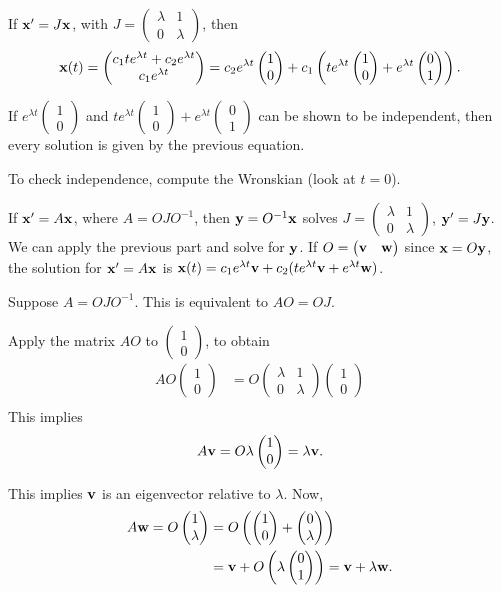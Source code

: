 \documentclass{article}
\newcommand{\mat}[1]{\begin{pmatrix}#1\end{pmatrix}}
\begin{document}
If $\mathbf{x}' = J \mathbf{x}$, with $J = \mat{\lambda & 1 \\ 0 & \lambda}$, then
\begin{align*}
  \mbf{x}(t) = \mat{c_1 t e^{\lambda t} + c_2 e^{\lambda t} \\ c_1 e^{\lambda t}} = c_2 e^{\lambda t} \mat{1 \\ 0} + c_1 \left( t e^{\lambda t} \mat{1 \\ 0} + e^{\lambda t} \mat{0 \\ 1} \right).
\end{align*}

If $e^{\lambda t} \mat{1 \\ 0}$ and $t e^{\lambda t} \mat{1 \\ 0} + e^{\lambda t} \mat{0 \\ 1}$ can be shown to be independent, then every solution is given by the previous equation.

To check independence, compute the Wronskian (look at $t=0$).

If $\mathbf{x}' = A \mathbf{x}$, where $A = O J O^{-1}$, then $\mathbf{y} = O^{-1} \mathbf{x}$ solves $J = \mat{\lambda & 1 \\ 0 & \lambda}$, $\mathbf{y}' = J \mathbf{y}$.  We can apply the previous part and solve for $\mathbf{y}$.  If $O = \mat{\mbf{v} & \mbf{w}}$ since $\mathbf{x} = O \mathbf{y}$, the solution for $\mathbf{x}' = A \mathbf{x}$ is $\mathbf{x}(t) = c_1 e^{\lambda t} \mathbf{v} + c_2(t e^{\lambda t} \mathbf{v} + e^{\lambda t} \mathbf{w})$.

Suppose $A = O J O^{-1}$.  This is equivalent to $AO = OJ$.

Apply the matrix $AO$ to $\mat{1 \\ 0}$, to obtain
\begin{align*}
  AO \mat{1 \\ 0} &= O \mat{\lambda & 1 \\ 0 & \lambda} \mat{1 \\ 0} \\
\end{align*}
This implies
\begin{align*}
  A \mbf{v} = O \lambda \mat{1 \\ 0} = \lambda \mbf{v}.
\end{align*}

This implies $\mathbf{v}$ is an eigenvector relative to $\lambda$.  Now, 
\begin{align*}
  A \mbf{w} = O \mat{1 \\ \lambda} &= O \left(  \mat{1 \\ 0} + \mat{0 \\ \lambda} \right) \\
  &= \mbf{v} + O\left( \lambda \mat{0 \\ 1} \right) = \mbf{v} + \lambda \mbf{w}.
\end{align*}
\end{document}
